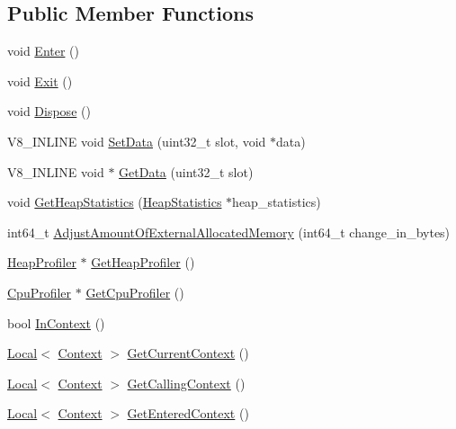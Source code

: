 \subsection*{Public Member Functions}
\begin{DoxyCompactItemize}
\item 
void \hyperlink{classv8_1_1Isolate_aec80bb49b6b7647ff75e8f2cc9484ea3}{Enter} ()
\item 
void \hyperlink{classv8_1_1Isolate_a64a8503cafd00d1d2cadfbb0c2345054}{Exit} ()
\item 
void \hyperlink{classv8_1_1Isolate_a1a5a5762e4221aff8c6b10f9e3cec0af}{Dispose} ()
\item 
V8\-\_\-\-I\-N\-L\-I\-N\-E void \hyperlink{classv8_1_1Isolate_a2ae968a7ff8a397f1ac09d32990883f6}{Set\-Data} (uint32\-\_\-t slot, void $\ast$data)
\item 
V8\-\_\-\-I\-N\-L\-I\-N\-E void $\ast$ \hyperlink{classv8_1_1Isolate_aed85b3c82bf69a60ecebc2558ab95083}{Get\-Data} (uint32\-\_\-t slot)
\item 
void \hyperlink{classv8_1_1Isolate_add32e78544edaf8946ed9b328167e5e4}{Get\-Heap\-Statistics} (\hyperlink{classv8_1_1HeapStatistics}{Heap\-Statistics} $\ast$heap\-\_\-statistics)
\item 
int64\-\_\-t \hyperlink{classv8_1_1Isolate_aaeda5fa60961a3d9d476c46200e30711}{Adjust\-Amount\-Of\-External\-Allocated\-Memory} (int64\-\_\-t change\-\_\-in\-\_\-bytes)
\item 
\hyperlink{classv8_1_1HeapProfiler}{Heap\-Profiler} $\ast$ \hyperlink{classv8_1_1Isolate_a9c48259615e8370f6f0efd27cd7f99a6}{Get\-Heap\-Profiler} ()
\item 
\hyperlink{classv8_1_1CpuProfiler}{Cpu\-Profiler} $\ast$ \hyperlink{classv8_1_1Isolate_a7eb415d9210d912aa57877ab6416fec8}{Get\-Cpu\-Profiler} ()
\item 
bool \hyperlink{classv8_1_1Isolate_afb6bbd31a87d0999dbbe5402447690a9}{In\-Context} ()
\item 
\hyperlink{classv8_1_1Local}{Local}$<$ \hyperlink{classv8_1_1Context}{Context} $>$ \hyperlink{classv8_1_1Isolate_afa1b6cde5a7a7cfde87eaabc4ab34062}{Get\-Current\-Context} ()
\item 
\hyperlink{classv8_1_1Local}{Local}$<$ \hyperlink{classv8_1_1Context}{Context} $>$ \hyperlink{classv8_1_1Isolate_a2fba719b7a022ece0b0bfe55f52b3138}{Get\-Calling\-Context} ()
\item 
\hyperlink{classv8_1_1Local}{Local}$<$ \hyperlink{classv8_1_1Context}{Context} $>$ \hyperlink{classv8_1_1Isolate_aff9eb2f5d199f8fcf59d9699194cd2e3}{Get\-Entered\-Context} ()

\end{DoxyCompactItemize}
